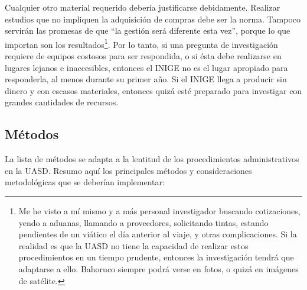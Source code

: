 \documentclass[12pt,letterpaper,spanish]{article}
\newcommand{\entacron}{INIGE}
\begin{document}
Cualquier otro material requerido debería justificarse debidamente. Realizar estudios que no impliquen la adquisición de compras debe ser la norma. Tampoco servirán las promesas de que ``la gestión será diferente esta vez'', porque lo que importan son los resultados\footnote{Me he visto a mí mismo y a más personal investigador buscando cotizaciones, yendo a aduanas, llamando a proveedores, solicitando tintas, estando pendientes de un viático el día anterior al viaje, y otras complicaciones. Si la realidad es que la UASD no tiene la capacidad de realizar estos procedimientos en un tiempo prudente, entonces la investigación tendrá que adaptarse a ello. Bahoruco siempre podrá verse en fotos, o quizá en imágenes de satélite.}. Por lo tanto, si una pregunta de investigación requiere de equipos costosos para ser respondida, o si ésta debe realizarse en lugares lejanos e inaccesibles, entonces el \entacron{} no es el lugar apropiado para responderla, al menos durante su primer año. Si el \entacron{} llega a producir sin dinero y con escasos materiales, entonces quizá esté preparado para investigar con grandes cantidades de recursos.

\subsection{Métodos}

La lista de métodos se adapta a la lentitud de los procedimientos administrativos en la UASD. Resumo aquí los principales métodos y consideraciones metodológicas que se deberían implementar:
\end{document}
